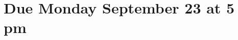 \documentclass[11pt,fleqn]{article}
\begin{document}
\maketitle
\section*{Due Monday September 23 at 5 pm}










\end{document}

